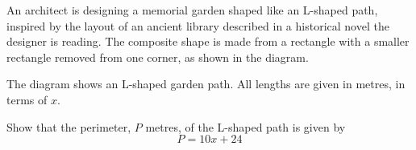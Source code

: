 \begin{question}
\noindent An architect is designing a memorial garden shaped like an L-shaped path, inspired by the layout of an ancient library described in a historical novel the designer is reading. The composite shape is made from a rectangle with a smaller rectangle removed from one corner, as shown in the diagram.

\begin{center}
\end{center}

\noindent The diagram shows an L-shaped garden path. All lengths are given in metres, in terms of $x$.

\noindent Show that the perimeter, $P$ metres, of the L-shaped path is given by
\[
P = 10x + 24
\]
\vspace{5cm}
\end{question}
